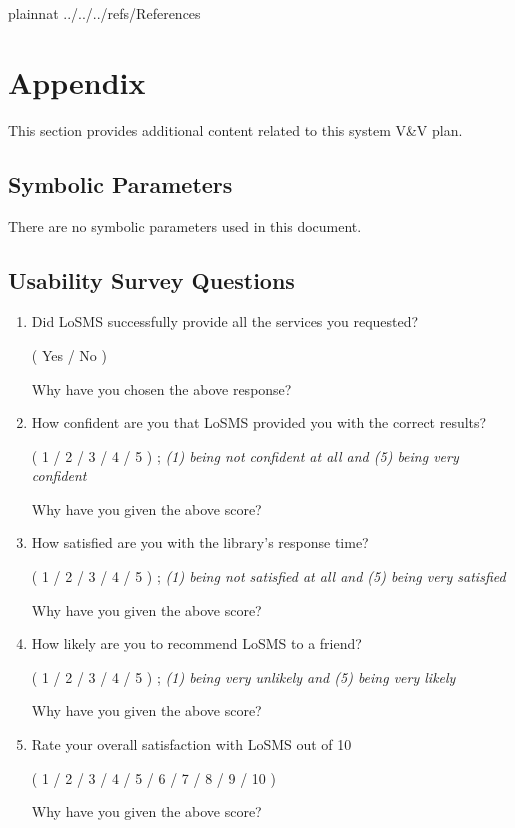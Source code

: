 \documentclass[12pt, titlepage]{article}
\newcommand{\famname}{LoSMS}
\begin{document}
\newpage
				
 {plainnat}
 {../../../refs/References}

\newpage

\section{Appendix}

This section provides additional content related to this system V\&V plan.

\subsection{Symbolic Parameters}

There are no symbolic parameters used in this document.

\subsection{Usability Survey Questions} \label{UsabilityTesting}

\begin{enumerate}
	\item Did \famname{} successfully provide all the services you requested?
	
	(	Yes	/	No	)
	
	Why have you chosen the above response?
	
	\item How confident are you that \famname{} provided you with the correct 
	results?
	
	(	1	/	2	/	3	/	4	/	5	) ; \textit{(1) being not confident 
	at all and (5) being very confident}

	Why have you given the above score?

	\item How satisfied are you with the library's response time?  
	
	(	1	/	2	/	3	/	4	/	5	) ; \textit{(1) being not satisfied 
	at all and (5) being very satisfied}

	Why have you given the above score?

	\item How likely are you to recommend \famname{} to a friend?
	
	(	1	/	2	/	3	/	4	/	5	) ; \textit{(1) being very unlikely 
	and (5) being very likely}

	Why have you given the above score?

	\item Rate your overall satisfaction with \famname{} out of 10 
	
	(	1	/	2	/	3	/	4	/	5	/	6	/	7	/	8	/	9	/	
	10	)
	
	Why have you given the above score?
\end {enumerate}

\end{document}
